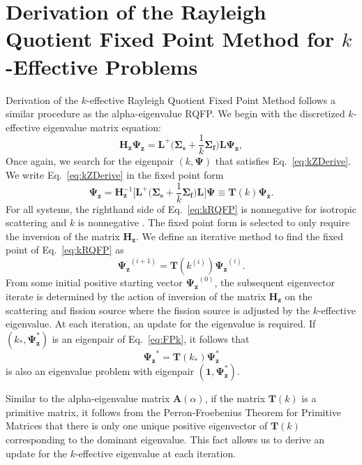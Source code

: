 \section{Derivation of the Rayleigh Quotient Fixed Point Method for $k$-Effective Problems}

Derivation of the $k$-effective Rayleigh Quotient Fixed Point Method follows a similar procedure as the alpha-eigenvalue RQFP. We begin with the discretized $k$-effective eigenvalue matrix equation:
\begin{equation}
	\mathbf{H_{z}} \mathbf{\Psi_{z}} = \mathbf{L}^{+} \bigg ( \mathbf{\Sigma_{s}} + \frac{1}{k}\mathbf{\Sigma_{f}} \bigg ) \mathbf{L} \mathbf{\Psi_{z}},
	\label{eq:kZDerive}
\end{equation}
Once again, we search for the eigenpair $(k, \mathbf{\Psi})$ that satisfies Eq.~\ref{eq:kZDerive}. We write Eq.~\ref{eq:kZDerive} in the fixed point form
\begin{equation}
	\mathbf{\Psi_{z}} = \mathbf{H}^{-1}_{\mathbf{z}} \bigg [ \mathbf{L}^{+} \bigg ( \mathbf{\Sigma_{s}} + \frac{1}{k} \mathbf{\Sigma_{f}} \bigg ) \mathbf{L} \bigg ] \mathbf{\Psi} \equiv \mathbf{T}(k) \mathbf{\Psi_{z}}.
	\label{eq:kRQFP}
\end{equation}
For all systems, the righthand side of Eq.~\ref{eq:kRQFP} is nonnegative for isotropic scattering and $k$ is nonnegative \cite{warsa}. The fixed point form is selected to only require the inversion of the matrix $\mathbf{H}_{\mathbf{z}}$.
We define an iterative method to find the fixed point of Eq.~\ref{eq:kRQFP} as
\begin{equation}
	\mathbf{\Psi_{z}}^{(i+1)} = \mathbf{T}(k^{(i)}) \mathbf{\Psi_{z}}^{(i)}.
	\label{eq:FPk}
\end{equation}
From some initial positive starting vector $\mathbf{\Psi_{z}}^{(0)}$, the subsequent eigenvector iterate is determined by the action of inversion of the matrix $\mathbf{H_{z}}$ on the scattering and fission source where the fission source is adjusted by the $k$-effective eigenvalue. At each iteration, an update for the eigenvalue is required. If $(k_{*},\mathbf{\Psi}_\mathbf{z}^{*})$ is an eigenpair of Eq.~\ref{eq:FPk}, it follows that
\begin{equation}
	\mathbf{\Psi_{z}}^{*} = \mathbf{T}(k_{*}) \mathbf{\Psi}_\mathbf{z}^{*}
\end{equation}
is also an eigenvalue problem with eigenpair $(\mathbf{1},\mathbf{\Psi}_\mathbf{z}^{*})$.

Similar to the alpha-eigenvalue matrix $\mathbf{A}(\alpha)$, if the matrix $\mathbf{T}(k)$ is a primitive matrix, it follows from the Perron-Froebenius Theorem for Primitive Matrices that there is only one unique positive eigenvector of $\mathbf{T}(k)$ corresponding to the dominant eigenvalue. This fact allows us to derive an update for the $k$-effective eigenvalue at each iteration.


